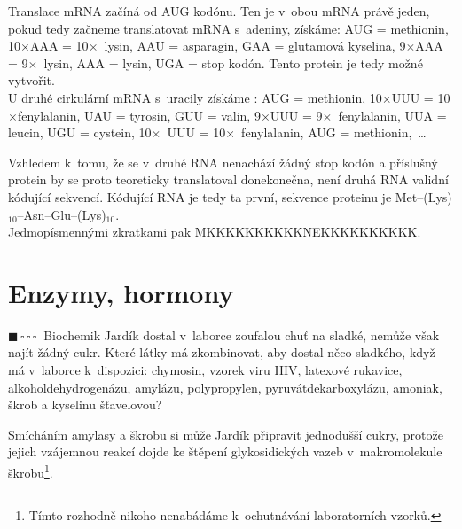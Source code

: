 \documentclass{book}
\newcommand{\jeden}{$\blacksquare \, \square \, \square \, \square \; \; $}
\renewenvironment{quotation}{\par}{\par} %
\begin{document}
Translace mRNA začíná od AUG kodónu. Ten je v~obou mRNA právě
jeden, pokud tedy začneme translatovat mRNA s~adeniny, získáme: AUG
= methionin, 10$\times$AAA = 10$\times$~lysin, AAU = asparagin, GAA = glutamová kyselina,
9$\times$AAA = 9$\times$~lysin, AAA = lysin, UGA = stop kodón. Tento protein je
tedy možné vytvořit.\\
U druhé cirkulární mRNA s~uracily získáme : AUG = methionin, 10$\times$UUU = 10$\times$fenylalanin, UAU = tyrosin, GUU = valin, 9$\times$UUU = 9$\times$~fenylalanin, UUA = leucin, UGU = cystein, 10$\times$~UUU = 10$\times$~fenylalanin, AUG = methionin,~\ldots

Vzhledem k~tomu, že se v~druhé RNA nenachází žádný stop kodón a příslušný protein by se proto teoreticky translatoval donekonečna, není druhá RNA validní kódující sekvencí. Kódující RNA je tedy ta první, sekvence proteinu je Met--(Lys)$_{10}$--Asn--Glu--(Lys)$_{10}$. \\
Jedmopísmennými zkratkami pak MKKKKKKKKKKNEKKKKKKKKKK.

\section{Enzymy, hormony}

\begin{quotation}
\jeden Biochemik Jardík dostal v~laborce zoufalou chuť na sladké, nemůže
však najít žádný cukr. Které látky má zkombinovat, aby dostal něco
sladkého, když má v~laborce k~dispozici: chymosin, vzorek viru HIV,
latexové rukavice, alkoholdehydrogenázu, amylázu, polypropylen, pyruvátdekarboxylázu,
amoniak, škrob a kyselinu šťavelovou?
\end{quotation} \dotfill \par 
Smícháním amylasy a škrobu si může Jardík připravit jednodušší cukry, protože jejich vzájemnou reakcí dojde ke štěpení glykosidických vazeb v~makromolekule škrobu\footnote{Tímto rozhodně nikoho nenabádáme k~ochutnávání laboratorních vzorků.}.
\end{document}
